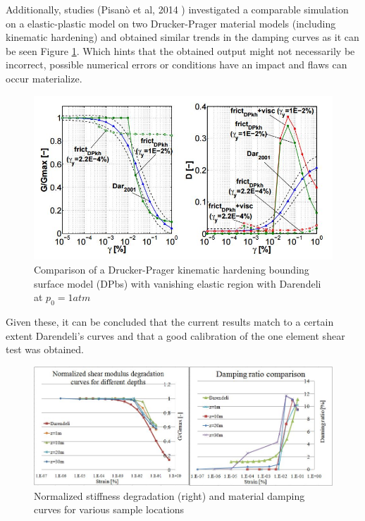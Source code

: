 \documentclass[12pt,a4paper]{report}
\begin{document}
Additionally, studies (Pisan\`{o} et al, 2014 \cite{papadrakakiscomparison}) investigated a comparable simulation on a elastic-plastic model on two Drucker-Prager material models (including kinematic hardening) and obtained similar trends in the damping curves as it can be seen Figure \ref{pisano}. Which hints that the obtained output might not necessarily be incorrect, possible numerical errors or conditions have an impact and flaws can occur materialize. 
\begin{figure}
	\centering
	\includegraphics[width=0.9 \linewidth]{pisano}
	\caption{Comparison of a Drucker-Prager kinematic hardening bounding surface model (DPbs) with vanishing elastic region with Darendeli at $p_0=1 atm$}
	\label{pisano}
\end{figure}

Given these, it can be concluded that the current results match to a certain extent Darendeli's curves and that a good calibration of the one element shear test was obtained.


\begin{figure}
	\centering
	\includegraphics[width=1 \linewidth]{ggmax}
	\caption{Normalized stiffness degradation (right) and material damping curves for various sample locations}
	\label{ggmaxi}
\end{figure}
\end{document}
